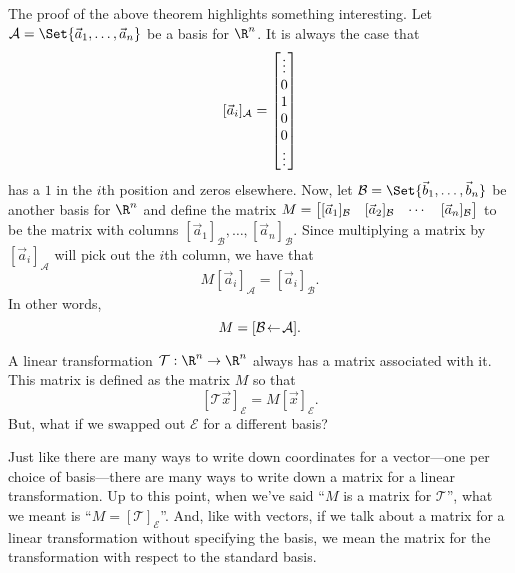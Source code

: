 The proof of the above theorem highlights something interesting. Let $\mathcal A=\Set{\vec a_1,\ldots, \vec a_n}$
be a basis for $\R^n$. It is always the case that
\[
	[\vec a_i]_{\mathcal A}=\matc{\vdots\\0\\1\\0\\0\\\vdots}
\]
has a $1$ in the $i$th position and zeros elsewhere. Now, let 
$\mathcal B=\Set{\vec b_1,\ldots,\vec b_n}$ be another basis for $\R^n$
and define the matrix $M=\mat{[\vec a_1]_{\mathcal B}&[\vec a_2]_{\mathcal B}&\cdots&[\vec a_n]_{\mathcal B}}$
to be the matrix with columns $[\vec a_1]_{\mathcal B},\ldots, [\vec a_n]_{\mathcal B}$.
Since multiplying a matrix by $[\vec a_i]_{\mathcal A}$ will pick out the $i$th column, we have that
\[
	M[\vec a_i]_{\mathcal A} = [\vec a_i]_{\mathcal B}.
\]
In other words,
\[
	M=\BasisChange{\mathcal A}{\mathcal B}.
\]

A linear transformation $\mathcal T:\R^n\to\R^n$ always has a matrix associated with it.
This matrix is defined as the matrix $M$ so that
\[
	[\mathcal T\vec x]_{\mathcal E}=M[\vec x]_{\mathcal E}.
\]
But, what if we swapped out $\mathcal E$ for a different basis?


Just like there are many ways to write down coordinates for a vector---one per choice of basis---there
are many ways to write down a matrix for a linear transformation. Up to this point, when we've said
``$M$ is a matrix for $\mathcal T$'', what we meant is ``$M=[\mathcal T]_{\mathcal E}$''. And, like
with vectors, if we talk about a matrix for a linear transformation without specifying the basis,
we mean the matrix for the transformation with respect to the standard basis.

